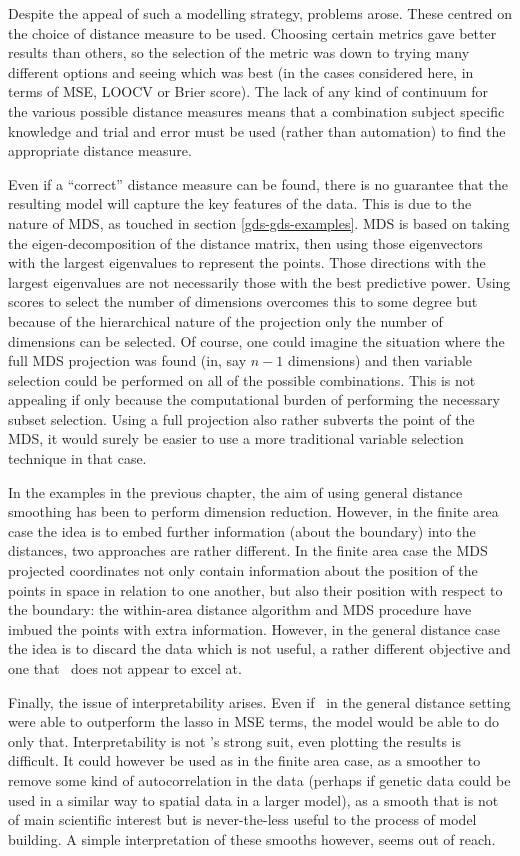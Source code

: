 Despite the appeal of such a modelling strategy, problems arose. These centred on the choice of distance measure to be used. Choosing certain metrics gave better results than others, so the selection of the metric was down to trying many different options and seeing which was best (in the cases considered here, in terms of MSE, LOOCV or Brier score). The lack of any kind of continuum for the various possible distance measures means that a combination subject specific knowledge and trial and error must be used (rather than automation) to find the appropriate distance measure.

Even if a ``correct'' distance measure can be found, there is no guarantee that the resulting model will capture the key features of the data. This is due to the nature of MDS, as touched in section \ref{gds-gds-examples}. MDS is based on taking the eigen-decomposition of the distance matrix, then using those eigenvectors with the largest eigenvalues to represent the points. Those directions with the largest eigenvalues are not necessarily those with the best predictive power. Using scores to select the number of dimensions overcomes this to some degree but because of the hierarchical nature of the projection only the number of dimensions can be selected. Of course, one could imagine the situation where the full MDS projection was found (in, say $n-1$ dimensions) and then variable selection could be performed on all of the possible combinations. This is not appealing if only because the computational burden of performing the necessary subset selection. Using a full projection also rather subverts the point of the MDS, it would surely be easier to use a more traditional variable selection technique in that case.

In the examples in the previous chapter, the aim of using general distance smoothing has been to perform dimension reduction. However, in the finite area case the idea is to embed further information (about the boundary) into the distances, two approaches are rather different. In the finite area case the MDS projected coordinates not only contain information about the position of the points in space in relation to one another, but also their position with respect to the boundary: the within-area distance algorithm and MDS procedure have imbued the points with extra information. However, in the general distance case the idea is to discard the data which is not useful, a rather different objective and one that \mdsds\ does not appear to excel at.

Finally, the issue of interpretability arises. Even if \mdsds\ in the general distance setting were able to outperform the lasso in MSE terms, the model would be able to do only that. Interpretability is not \mdsds's strong suit, even plotting the results is difficult. It could however be used as in the finite area case, as a smoother to remove some kind of autocorrelation in the data (perhaps if genetic data could be used in a similar way to spatial data in a larger model), as a smooth that is not of main scientific interest but is never-the-less useful to the process of model building. A simple interpretation of these smooths however, seems out of reach.


